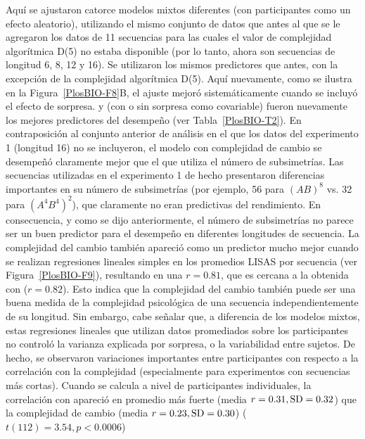 Aquí se ajustaron catorce modelos mixtos diferentes (con participantes como un efecto aleatorio), utilizando el mismo conjunto de datos que antes al que se le agregaron los datos de 11 secuencias para las cuales el valor de complejidad algorítmica D(5) no estaba disponible (por lo tanto, ahora son secuencias de longitud 6, 8, 12 y 16). Se utilizaron los mismos predictores que antes, con la excepción de la complejidad algorítmica D(5). Aquí nuevamente, como se ilustra en la Figura~\ref{PlosBIO-F8}B, el ajuste mejoró sistemáticamente cuando se incluyó el efecto de sorpresa. \mdlbinfrag y \mdlbin (con o sin sorpresa como covariable) fueron nuevamente los mejores predictores del desempeño (ver Tabla~\ref{PlosBIO-T2}). En contraposición al conjunto anterior de análisis en el que los datos del experimento 1 (longitud 16) no se incluyeron, el modelo con complejidad de cambio se desempeñó claramente mejor que el que utiliza el número de subsimetrías. Las secuencias utilizadas en el experimento 1 de hecho presentaron diferencias importantes en su número de subsimetrías (por ejemplo, 56 para $(AB)^8$ vs. 32 para $(A^4B^4)^2$), que claramente no eran predictivas del rendimiento. En consecuencia, y como se dijo anteriormente, el número de subsimetrías no parece ser un buen predictor para el desempeño en diferentes longitudes de secuencia. La complejidad del cambio también apareció como un predictor mucho mejor cuando se realizan regresiones lineales simples en los promedios LISAS por secuencia (ver Figura~\ref{PlosBIO-F9}), resultando en una $r = 0.81$, que es cercana a la obtenida con \mdlbin ($r = 0.82$). Esto indica que la complejidad del cambio también puede ser una buena medida de la complejidad psicológica de una secuencia independientemente de su longitud. Sin embargo, cabe señalar que, a diferencia de los modelos mixtos, estas regresiones lineales que utilizan datos promediados sobre los participantes no controló la varianza explicada por sorpresa, o la variabilidad entre sujetos. De hecho, se observaron variaciones importantes entre participantes con respecto a la correlación con la complejidad (especialmente para experimentos con secuencias más cortas). Cuando se calcula a nivel de participantes individuales, la correlación con \mdlbin apareció en promedio más fuerte (media $r = 0.31, {\rm SD} = 0.32$) que la complejidad de cambio (media $r = 0.23, {\rm SD} = 0.30$) ($t (112) = 3.54, p < 0.0006$)

